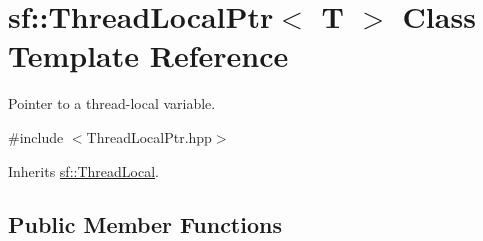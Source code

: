 \hypertarget{classsf_1_1_thread_local_ptr}{\section{sf\+:\+:Thread\+Local\+Ptr$<$ T $>$ Class Template Reference}
\label{classsf_1_1_thread_local_ptr}
}


Pointer to a thread-\/local variable.  




{\ttfamily \#include $<$Thread\+Local\+Ptr.\+hpp$>$}



Inherits \hyperlink{classsf_1_1_thread_local}{sf\+::\+Thread\+Local}.

\subsection*{Public Member Functions}
